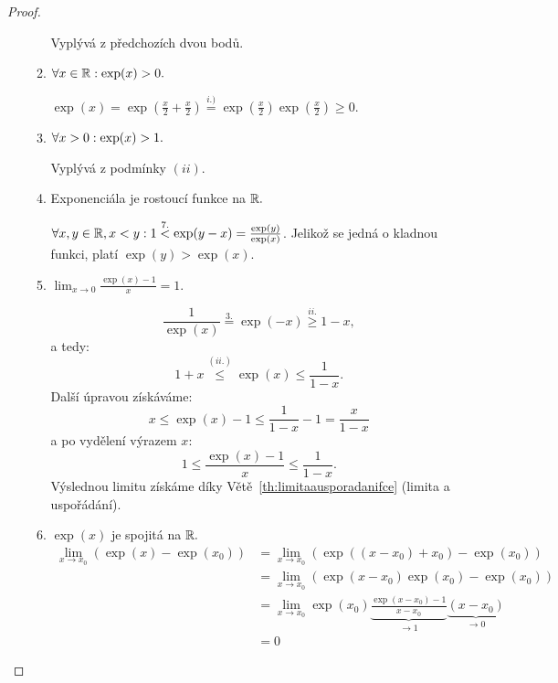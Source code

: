 \begin{proof}
\begin{enumerate}[A.]
\begin{enumerate}[1.]
                    Vyplývá z předchozích dvou bodů.

                \item $\forall x \in \mathbb{R}: \exp(x) > 0.$

                    $\exp(x) = \exp(\frac{x}{2} + \frac{x}{2}) \stackrel{i.)}{=}
                                    \exp(\frac{x}{2})\exp(\frac{x}{2}) \geq 0.$

                \item $\forall x > 0: \exp(x) > 1.$

                    Vyplývá z podmínky $(ii).$

                \item Exponenciála je rostoucí funkce na $\mathbb{R}.$

                    $\forall x, y \in \mathbb{R}, x < y: 1 \stackrel{7.}{<} \exp(y - x) = 
                    \frac{\exp(y)}{\exp(x)}$. Jelikož se jedná o kladnou funkci, platí
                    $\exp(y) > \exp(x).$

                \item $\lim_{x \to 0} \frac{\exp(x) -1}{x} = 1.$

                    $$\frac{1}{\exp(x)} \stackrel{3.}{=} \exp(-x) \stackrel{ii.}{\geq} 1-x,$$          
                    a tedy: $$1 + x \stackrel{(ii.)}{\leq} \exp(x) \leq \frac{1}{1-x}.$$ 
                    Další úpravou získáváme:
                    $$x \leq \exp(x) -1  \leq \frac{1}{1-x} - 1 = \frac{x}{1-x}$$
                    a po vydělení výrazem $x$:
                    $$1 \leq \frac{\exp(x) - 1}{x} \leq \frac{1}{1-x}.$$
                    Výslednou limitu získáme díky Větě~\ref{th:limitaausporadanifce} 
                    (limita a uspořádání).

                \item $\exp(x)$ je spojitá na $\mathbb{R}.$
                    \begin{align*}
                        \lim_{x \to x_0} (\exp(x) - \exp(x_0)) &= \lim_{x \to x_0} 
                        (\exp((x-x_0) + x_0) - \exp(x_0)) \\
                        &= \lim_{x\to x_0} (\exp(x - x_0)\exp(x_0) - \exp(x_0)) \\
                        &= \lim_{x \to x_0} \exp(x_0) \underbrace{\frac{\exp(x-x_0) - 1}{x - x_0}}_{\to 1} 
                        \underbrace{(x - x_0)}_{\to 0} \\
                        &= 0
                    \end{align*}


\end{enumerate}
\end{enumerate}
\end{proof}
